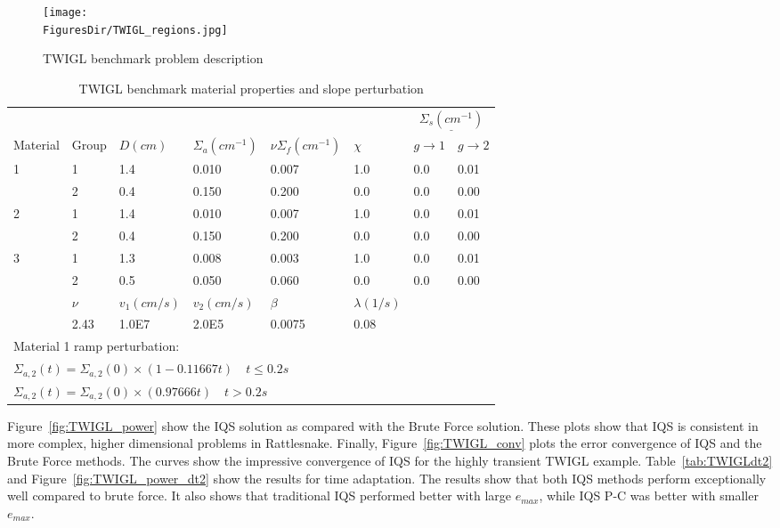 \documentclass[12pt]{scrartcl}
\newcommand{\fig}[1]{Figure~\ref{#1}}                      %
\newcommand{\tbl}[1]{Table~\ref{#1}}                     %
\newcommand{\FiguresDir}{./figs}
\begin{document}
\begin{figure}[!htbp]
\begin{center}
\texttt{[image: \\FiguresDir/TWIGL\_regions.jpg]}
\caption{TWIGL benchmark problem description}
\label{fig:TWIGL_reg}
\end{center}
\end{figure}

\begin{table}[!htbp]
\begin{center}
\caption{TWIGL benchmark material properties and slope perturbation}
\label{tab:TWIGL_mat}
\begin{tabular}{llllllll}
\hline
  &  &  &  &  &  &  \multicolumn{2}{c}{$\underline{\Sigma_s (cm^{-1})} $} \\
Material & Group & $D (cm)$ & $\Sigma_a (cm^{-1})$ & $\nu\Sigma_f (cm^{-1})$ & $\chi$ & $g \rightarrow 1$ & $g \rightarrow 2$ \\
\hline
1 & 1 & 1.4 & 0.010 & 0.007 & 1.0 & 0.0 & 0.01 \\
  & 2 & 0.4 & 0.150 & 0.200 & 0.0 & 0.0 & 0.00  \\
2 & 1 & 1.4 & 0.010 & 0.007 & 1.0 & 0.0 & 0.01  \\
  & 2 & 0.4 & 0.150 & 0.200 & 0.0 & 0.0 & 0.00  \\
3 & 1 & 1.3 & 0.008 & 0.003 & 1.0 & 0.0 & 0.01  \\
  & 2 & 0.5 & 0.050 & 0.060 & 0.0 & 0.0 & 0.00  \\
\hline
  & $\nu$ & $v_1 (cm/s)$ & $v_2 (cm/s)$ & $\beta$ & $\lambda (1/s)$ &   &   \\
\hline
  & 2.43 & 1.0E7 & 2.0E5 & 0.0075 & 0.08 &   &   \\
\hline
 \multicolumn{8}{l}{\footnotesize Material 1 ramp perturbation:} \\
\multicolumn{8}{l}{\footnotesize $\Sigma_{a,2}(t)=\Sigma_{a,2}(0) \times (1-0.11667t) \quad t \leq 0.2 s$} \\
\multicolumn{8}{l}{\footnotesize $\Sigma_{a,2}(t)=\Sigma_{a,2}(0) \times (0.97666t) \quad t > 0.2 s$} \normalsize
\end{tabular}
\end{center}
\end{table}

\fig{fig:TWIGL_power} show the IQS  solution as compared with the Brute Force solution.  These plots show that IQS is consistent in more complex, higher dimensional problems in Rattlesnake.  Finally, \fig{fig:TWIGL_conv} plots the error convergence of IQS and the Brute Force methods.  The curves show the impressive convergence of IQS for the highly transient TWIGL example.  \tbl{tab:TWIGLdt2} and \fig{fig:TWIGL_power_dt2} show the results for time adaptation.  The results show that both IQS methods perform exceptionally well compared to brute force.  It also shows that traditional IQS performed better with large $e_{max}$, while IQS P-C was better with smaller $e_{max}$.
\end{document}
